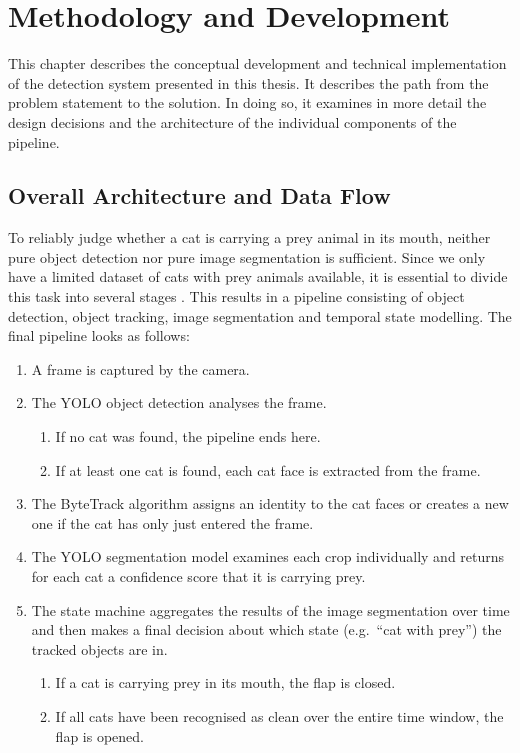\chapter{Methodology and Development}
\label{sec:methodik}

This chapter describes the conceptual development and technical implementation of the detection system presented in this thesis. It describes the path from the problem statement to the solution. In doing so, it examines in more detail the design decisions and the architecture of the individual components of the pipeline.

\section{Overall Architecture and Data Flow}
To reliably judge whether a cat is carrying a prey animal in its mouth, neither pure object detection nor pure image segmentation is sufficient. Since we only have a limited dataset of cats with prey animals available, it is essential to divide this task into several stages \cite{baumann2020smartcatflap}. This results in a pipeline consisting of object detection, object tracking, image segmentation and temporal state modelling. The final pipeline looks as follows:

\begin{enumerate}
	\item A frame is captured by the camera.
	\item The YOLO object detection analyses the frame.
	\begin{enumerate}
		\item If no cat was found, the pipeline ends here.
		\item If at least one cat is found, each cat face is extracted from the frame.
	\end{enumerate}
	\item The ByteTrack algorithm assigns an identity to the cat faces or creates a new one if the cat has only just entered the frame.
	\item The YOLO segmentation model examines each crop individually and returns for each cat a confidence score that it is carrying prey.
	\item The state machine aggregates the results of the image segmentation over time and then makes a final decision about which state (e.g.\ ``cat with prey'') the tracked objects are in.
	\begin{enumerate}
		\item If a cat is carrying prey in its mouth, the flap is closed.
		\item If all cats have been recognised as clean over the entire time window, the flap is opened.
	\end{enumerate}
\end{enumerate}

